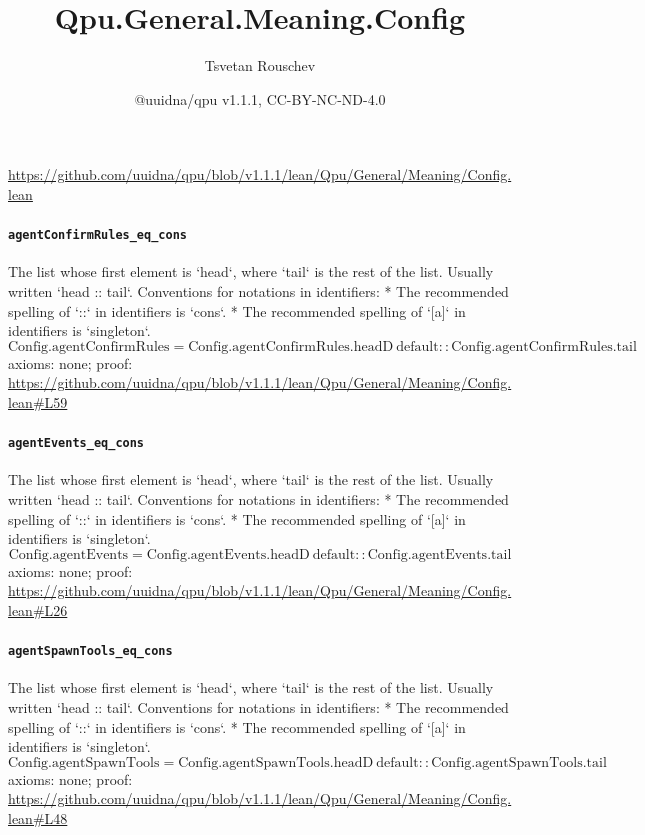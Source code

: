 \documentclass[11pt]{article}
\title{Qpu.General.Meaning.Config}
\author{Tsvetan Rouschev}
\date{@uuidna/qpu v1.1.1, CC-BY-NC-ND-4.0}
\begin{document}
\maketitle
\noindent\url{https://github.com/uuidna/qpu/blob/v1.1.1/lean/Qpu/General/Meaning/Config.lean}

\paragraph{\texttt{agentConfirmRules\_eq\_cons}}
The list whose first element is `head`, where `tail` is the rest of the list. Usually written `head :: tail`.   Conventions for notations in identifiers:   * The recommended spelling of `::` in identifiers is `cons`.   * The recommended spelling of `[a]` in identifiers is `singleton`.
\[ \mathrm{Config.agentConfirmRules} = \mathrm{Config.agentConfirmRules.headD}\ \mathrm{default} :: \mathrm{Config.agentConfirmRules.tail} \]
\noindent axioms: none; proof: \url{https://github.com/uuidna/qpu/blob/v1.1.1/lean/Qpu/General/Meaning/Config.lean\#L59}

\paragraph{\texttt{agentEvents\_eq\_cons}}
The list whose first element is `head`, where `tail` is the rest of the list. Usually written `head :: tail`.   Conventions for notations in identifiers:   * The recommended spelling of `::` in identifiers is `cons`.   * The recommended spelling of `[a]` in identifiers is `singleton`.
\[ \mathrm{Config.agentEvents} = \mathrm{Config.agentEvents.headD}\ \mathrm{default} :: \mathrm{Config.agentEvents.tail} \]
\noindent axioms: none; proof: \url{https://github.com/uuidna/qpu/blob/v1.1.1/lean/Qpu/General/Meaning/Config.lean\#L26}

\paragraph{\texttt{agentSpawnTools\_eq\_cons}}
The list whose first element is `head`, where `tail` is the rest of the list. Usually written `head :: tail`.   Conventions for notations in identifiers:   * The recommended spelling of `::` in identifiers is `cons`.   * The recommended spelling of `[a]` in identifiers is `singleton`.
\[ \mathrm{Config.agentSpawnTools} = \mathrm{Config.agentSpawnTools.headD}\ \mathrm{default} :: \mathrm{Config.agentSpawnTools.tail} \]
\noindent axioms: none; proof: \url{https://github.com/uuidna/qpu/blob/v1.1.1/lean/Qpu/General/Meaning/Config.lean\#L48}
\end{document}
